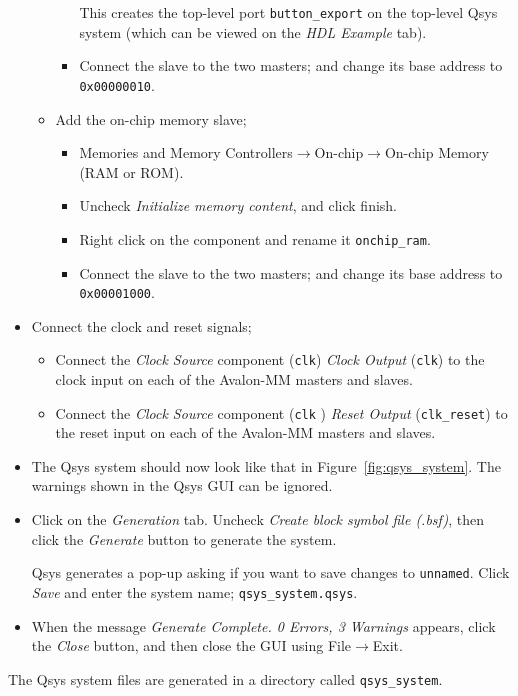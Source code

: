 \documentclass[10pt,twoside]{article}
\begin{document}
\begin{itemize}
\begin{itemize}
\begin{itemize}
This creates the top-level port \verb+button_export+ on
the top-level Qsys system (which can be viewed on the {\em HDL Example}
tab).
\item Connect the slave to the two masters; and change its base address to
\verb+0x00000010+.
\end{itemize}
%
\item Add the on-chip memory slave;
\begin{itemize}
\item Memories and Memory Controllers$\rightarrow$On-chip$\rightarrow$On-chip
Memory (RAM or ROM).
\item Uncheck {\em Initialize memory content}, and click finish.
\item Right click on the component and rename it \verb+onchip_ram+.
\item Connect the slave to the two masters; and change its base address to
\verb+0x00001000+.
\end{itemize}
%
\end{itemize}
%
\item Connect the clock and reset signals;
\begin{itemize}
\item Connect the {\em Clock Source} component (\verb+clk+) {\em Clock Output}
(\verb+clk+)  to the clock input on each of the Avalon-MM masters and slaves.
\item Connect the {\em Clock Source} component (\verb+clk+ ) {\em Reset Output}
(\verb+clk_reset+) to the reset input on each of the Avalon-MM masters and slaves.
\end{itemize}
%
\item The Qsys system should now look like that in Figure~\ref{fig:qsys_system}.
The warnings shown in the Qsys GUI can be ignored.
%
\item Click on the {\em Generation} tab. Uncheck {\em Create block symbol
file (.bsf)}, then click the {\em Generate} button to generate the system.

Qsys generates a pop-up asking if you want to save changes to \verb+unnamed+.
Click {\em Save} and enter the system name; \verb+qsys_system.qsys+. 

\item When the message {\em Generate Complete. 0 Errors, 3 Warnings} appears, click 
the {\em Close} button, and then close the GUI using File$\rightarrow$Exit.

\end{itemize}
%
The Qsys system files are generated in a directory called \verb+qsys_system+.
\end{document}
